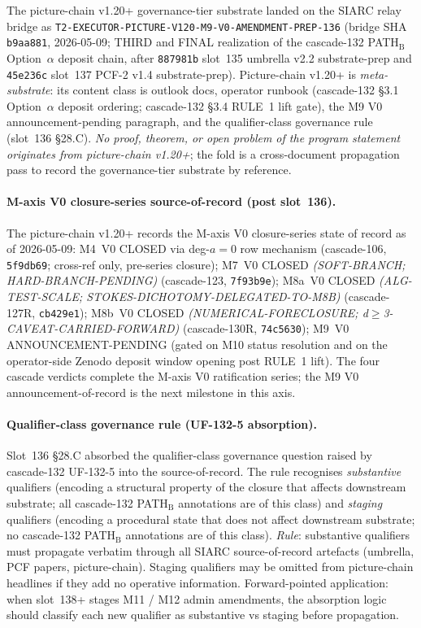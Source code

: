 \documentclass[11pt,a4paper]{article}
\theoremstyle{definition}
\theoremstyle{remark}
\begin{document}
The picture-chain v1.20+ governance-tier substrate landed on the
SIARC relay bridge as
\texttt{T2-EXECUTOR-PICTURE-V120-M9-V0-AMENDMENT-PREP-136} (bridge
SHA \texttt{b9aa881}, 2026-05-09; THIRD and FINAL realization of the
cascade-132 PATH$_{\mathrm{B}}$ Option~$\alpha$ deposit chain, after
\texttt{887981b} slot~135 umbrella v2.2 substrate-prep and
\texttt{45e236c} slot~137 PCF-2 v1.4 substrate-prep). Picture-chain
v1.20+ is \emph{meta-substrate}: its content class is outlook docs,
operator runbook (cascade-132 §3.1 Option~$\alpha$ deposit ordering;
cascade-132 §3.4 RULE~1 lift gate), the M9 V0
announcement-pending paragraph, and the qualifier-class governance
rule (slot~136 §28.C). \emph{No proof, theorem, or open problem of
the program statement originates from picture-chain v1.20+}; the
fold is a cross-document propagation pass to record the
governance-tier substrate by reference.

\paragraph{M-axis V0 closure-series source-of-record (post slot~136).}
The picture-chain v1.20+ records the M-axis V0 closure-series state
of record as of 2026-05-09: M4~V0 \textsf{CLOSED} via deg-$a=0$ row
mechanism (cascade-106, \texttt{5f9db69}; cross-ref only,
pre-series closure); M7~V0 \textsf{CLOSED} \emph{(SOFT-BRANCH;
HARD-BRANCH-PENDING)} (cascade-123, \texttt{7f93b9e}); M8a~V0
\textsf{CLOSED} \emph{(ALG-TEST-SCALE; STOKES-DICHOTOMY-DELEGATED-TO-M8B)}
(cascade-127R, \texttt{cb429e1}); M8b~V0 \textsf{CLOSED}
\emph{(NUMERICAL-FORECLOSURE; d$\geq$3-CAVEAT-CARRIED-FORWARD)}
(cascade-130R, \texttt{74c5630}); M9~V0
\textsf{ANNOUNCEMENT-PENDING} (gated on M10 status resolution and on
the operator-side Zenodo deposit window opening post RULE~1 lift).
The four cascade verdicts complete the M-axis V0 ratification
series; the M9 V0 announcement-of-record is the next milestone in
this axis.

\paragraph{Qualifier-class governance rule (UF-132-5 absorption).}
Slot~136 §28.C absorbed the qualifier-class governance question
raised by cascade-132 UF-132-5 into the source-of-record. The rule
recognises \emph{substantive} qualifiers (encoding a structural
property of the closure that affects downstream substrate; all
cascade-132 PATH$_{\mathrm{B}}$ annotations are of this class) and
\emph{staging} qualifiers (encoding a procedural state that does
not affect downstream substrate; no cascade-132 PATH$_{\mathrm{B}}$
annotations are of this class). \emph{Rule}: substantive
qualifiers must propagate verbatim through all SIARC
source-of-record artefacts (umbrella, PCF papers, picture-chain).
Staging qualifiers may be omitted from picture-chain headlines if
they add no operative information. Forward-pointed application:
when slot~138+ stages M11 / M12 admin amendments, the absorption
logic should classify each new qualifier as substantive vs staging
before propagation.
\end{document}
